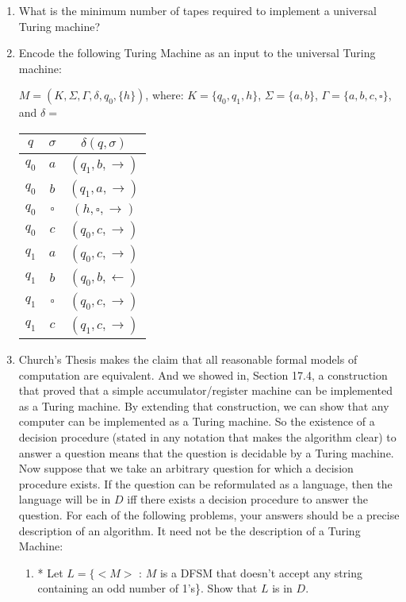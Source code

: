 \documentclass[10pt]{article}
\begin{document}
\begin{enumerate}[1)]

\item
What is the minimum number of tapes required to implement a universal Turing machine?


\item
Encode the following Turing Machine as an input to the universal Turing machine:
\begin{center}
$M = (K, \Sigma, \Gamma, \delta, q_0, \{h\})$, where:   $K = \{q_0, q_1, h\}$,  $\Sigma = \{a, b\}$,  $\Gamma = \{a, b, c, \square\}$, and $\delta =$\\
\vspace{.5cm}
\begin{tabular}{|c|c|c|}
\hline
$q$&$\sigma$&$\delta(q, \sigma)$\\ \hline
$q_0$&$a$&$(q_1, b, \rightarrow)$\\ \hline
$q_0$&$b$&$(q_1, a, \rightarrow)$\\ \hline
$q_0$&$\square$&$(h, \square, \rightarrow)$\\ \hline
$q_0$&$c$&$(q_0, c, \rightarrow)$\\ \hline
$q_1$&$a$&$(q_0, c, \rightarrow)$\\ \hline
$q_1$&$b$&$(q_0, b, \leftarrow)$\\ \hline
$q_1$&$\square$&$(q_0, c, \rightarrow)$\\ \hline
$q_1$&$c$&$(q_1, c, \rightarrow)$\\
\hline
\end{tabular}
\end{center}

\pagebreak

\item
Church’s Thesis makes the claim that all reasonable formal models of computation are equivalent.  And we showed in, Section 17.4, a construction that proved that a simple accumulator/register machine can be implemented as a Turing machine.  By extending that construction, we can show that any computer can be implemented as a Turing machine.  So the existence of a decision procedure (stated in any notation that makes the algorithm clear) to answer a question means that the question is decidable by a Turing machine.\\

\noindent
Now suppose that we take an arbitrary question for which a decision procedure exists.  If the question can be reformulated as a language, then the language will be in $D$ iff there exists a decision procedure to answer the question.  For each of the following problems, your answers should be a precise description of an algorithm.  It need not be the description of a Turing Machine:
\begin{enumerate}
\item
* Let $L = \{<M>$ : $M$ is a DFSM that doesn’t accept any string containing an odd number of 1’s\}.  Show that 
$L$ is in $D$.


\end{enumerate}
\end{enumerate}
\end{document}
